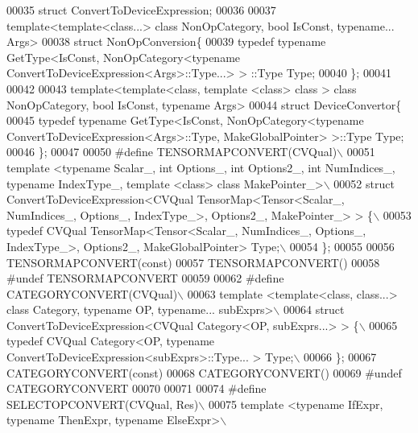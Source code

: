 \begin{DoxyCode}
00035 \textcolor{keyword}{struct }ConvertToDeviceExpression;
00036 
00037 \textcolor{keyword}{template}<\textcolor{keyword}{template}<\textcolor{keyword}{class}...> \textcolor{keyword}{class }NonOpCategory, \textcolor{keywordtype}{bool} IsConst, \textcolor{keyword}{typename}... Args>
00038 \textcolor{keyword}{struct }NonOpConversion\{
00039   \textcolor{keyword}{typedef} \textcolor{keyword}{typename} GetType<IsConst, NonOpCategory<typename ConvertToDeviceExpression<Args>::Type...> >
      ::Type Type;
00040 \};
00041 
00042 
00043 \textcolor{keyword}{template}<\textcolor{keyword}{template}<\textcolor{keyword}{class}, \textcolor{keyword}{template} <\textcolor{keyword}{class}> \textcolor{keyword}{class }> \textcolor{keyword}{class }NonOpCategory, bool IsConst, typename Args>
00044 struct DeviceConvertor\{
00045   \textcolor{keyword}{typedef} \textcolor{keyword}{typename} GetType<IsConst, NonOpCategory<typename ConvertToDeviceExpression<Args>::Type, 
      MakeGlobalPointer> >::Type Type;
00046 \};
00047 
00050 \textcolor{preprocessor}{#define TENSORMAPCONVERT(CVQual)\(\backslash\)}
00051 \textcolor{preprocessor}{template <typename Scalar\_, int Options\_, int Options2\_, int NumIndices\_, typename IndexType\_, template
       <class> class MakePointer\_>\(\backslash\)}
00052 \textcolor{preprocessor}{struct ConvertToDeviceExpression<CVQual TensorMap<Tensor<Scalar\_, NumIndices\_, Options\_, IndexType\_>,
       Options2\_, MakePointer\_> > \{\(\backslash\)}
00053 \textcolor{preprocessor}{  typedef CVQual TensorMap<Tensor<Scalar\_, NumIndices\_, Options\_, IndexType\_>, Options2\_,
       MakeGlobalPointer> Type;\(\backslash\)}
00054 \textcolor{preprocessor}{\};}
00055 
00056 TENSORMAPCONVERT(\textcolor{keyword}{const})
00057 TENSORMAPCONVERT()
00058 \textcolor{preprocessor}{#undef TENSORMAPCONVERT}
00059 
00062 \textcolor{preprocessor}{#define CATEGORYCONVERT(CVQual)\(\backslash\)}
00063 \textcolor{preprocessor}{template <template<class, class...> class Category, typename OP, typename... subExprs>\(\backslash\)}
00064 \textcolor{preprocessor}{struct ConvertToDeviceExpression<CVQual Category<OP, subExprs...> > \{\(\backslash\)}
00065 \textcolor{preprocessor}{  typedef CVQual Category<OP, typename ConvertToDeviceExpression<subExprs>::Type... > Type;\(\backslash\)}
00066 \textcolor{preprocessor}{\};}
00067 CATEGORYCONVERT(\textcolor{keyword}{const})
00068 CATEGORYCONVERT()
00069 \textcolor{preprocessor}{#undef CATEGORYCONVERT}
00070 
00071 
00074 \textcolor{preprocessor}{#define SELECTOPCONVERT(CVQual, Res)\(\backslash\)}
00075 \textcolor{preprocessor}{template <typename IfExpr, typename ThenExpr, typename ElseExpr>\(\backslash\)}

\end{DoxyCode}
